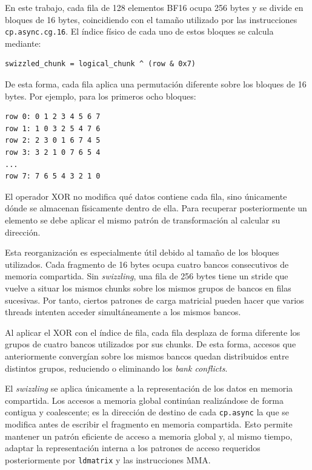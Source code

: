 En este trabajo, cada fila de 128 elementos BF16 ocupa 256 bytes y se divide en bloques de 16 bytes, coincidiendo con el tamaño utilizado por las instrucciones \texttt{cp.async.cg.16}. El índice físico de cada uno de estos bloques se calcula mediante:

\begin{verbatim}
swizzled_chunk = logical_chunk ^ (row & 0x7)
\end{verbatim}

De esta forma, cada fila aplica una permutación diferente sobre los bloques de 16 bytes. Por ejemplo, para los primeros ocho bloques:

\begin{verbatim}
row 0: 0 1 2 3 4 5 6 7
row 1: 1 0 3 2 5 4 7 6
row 2: 2 3 0 1 6 7 4 5
row 3: 3 2 1 0 7 6 5 4
...
row 7: 7 6 5 4 3 2 1 0
\end{verbatim}

El operador XOR no modifica qué datos contiene cada fila, sino únicamente dónde se almacenan físicamente dentro de ella. Para recuperar posteriormente un elemento se debe aplicar el mismo patrón de transformación al calcular su dirección.

Esta reorganización es especialmente útil debido al tamaño de los bloques utilizados. Cada fragmento de 16 bytes ocupa cuatro bancos consecutivos de memoria compartida. Sin \textit{swizzling}, una fila de 256 bytes tiene un stride que vuelve a situar los mismos chunks sobre los mismos grupos de bancos en filas sucesivas. Por tanto, ciertos patrones de carga matricial pueden hacer que varios threads intenten acceder simultáneamente a los mismos bancos.

Al aplicar el XOR con el índice de fila, cada fila desplaza de forma diferente los grupos de cuatro bancos utilizados por sus chunks. De esta forma, accesos que anteriormente convergían sobre los mismos bancos quedan distribuidos entre distintos grupos, reduciendo o eliminando los \textit{bank conflicts}.

El \textit{swizzling} se aplica únicamente a la representación de los datos en memoria compartida. Los accesos a memoria global continúan realizándose de forma contigua y coalescente; es la dirección de destino de cada \texttt{cp.async} la que se modifica antes de escribir el fragmento en memoria compartida. Esto permite mantener un patrón eficiente de acceso a memoria global y, al mismo tiempo, adaptar la representación interna a los patrones de acceso requeridos posteriormente por \texttt{ldmatrix} y las instrucciones MMA.


